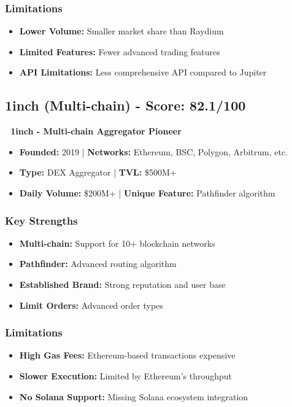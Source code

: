 \documentclass[11pt,a4paper]{article}
\begin{document}
\subsubsection{Limitations}
\begin{itemize}
    \item \textbf{Lower Volume:} Smaller market share than Raydium
    \item \textbf{Limited Features:} Fewer advanced trading features
    \item \textbf{API Limitations:} Less comprehensive API compared to Jupiter
\end{itemize}

\subsection{1inch (Multi-chain) - Score: 82.1/100}

\begin{tcolorbox}[colback=warningOrange!10,colframe=warningOrange]
\textbf{🔄 1inch - Multi-chain Aggregator Pioneer}
\begin{itemize}
    \item \textbf{Founded:} 2019 | \textbf{Networks:} Ethereum, BSC, Polygon, Arbitrum, etc.
    \item \textbf{Type:} DEX Aggregator | \textbf{TVL:} \$500M+
    \item \textbf{Daily Volume:} \$200M+ | \textbf{Unique Feature:} Pathfinder algorithm
\end{itemize}
\end{tcolorbox}

\subsubsection{Key Strengths}
\begin{itemize}
    \item \textbf{Multi-chain:} Support for 10+ blockchain networks
    \item \textbf{Pathfinder:} Advanced routing algorithm
    \item \textbf{Established Brand:} Strong reputation and user base
    \item \textbf{Limit Orders:} Advanced order types
\end{itemize}

\subsubsection{Limitations}
\begin{itemize}
    \item \textbf{High Gas Fees:} Ethereum-based transactions expensive
    \item \textbf{Slower Execution:} Limited by Ethereum's throughput
    \item \textbf{No Solana Support:} Missing Solana ecosystem integration
\end{itemize}
\end{document}
